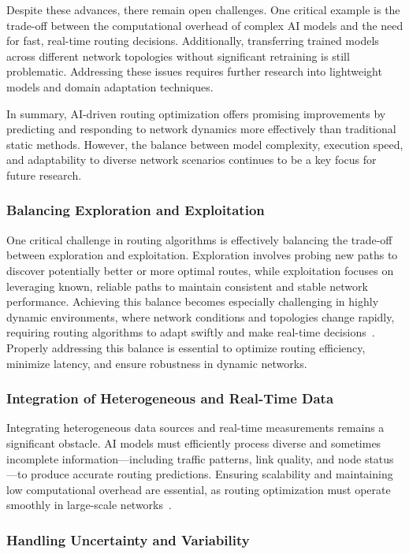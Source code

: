 \documentclass[sigconf]{acmart}
\begin{document}
Despite these advances, there remain open challenges. One critical example is the trade-off between the computational overhead of complex AI models and the need for fast, real-time routing decisions. Additionally, transferring trained models across different network topologies without significant retraining is still problematic. Addressing these issues requires further research into lightweight models and domain adaptation techniques.

In summary, AI-driven routing optimization offers promising improvements by predicting and responding to network dynamics more effectively than traditional static methods. However, the balance between model complexity, execution speed, and adaptability to diverse network scenarios continues to be a key focus for future research.

\subsubsection{Balancing Exploration and Exploitation}

One critical challenge in routing algorithms is effectively balancing the trade-off between exploration and exploitation. Exploration involves probing new paths to discover potentially better or more optimal routes, while exploitation focuses on leveraging known, reliable paths to maintain consistent and stable network performance. Achieving this balance becomes especially challenging in highly dynamic environments, where network conditions and topologies change rapidly, requiring routing algorithms to adapt swiftly and make real-time decisions~\cite{}. Properly addressing this balance is essential to optimize routing efficiency, minimize latency, and ensure robustness in dynamic networks.

\subsubsection{Integration of Heterogeneous and Real-Time Data}

Integrating heterogeneous data sources and real-time measurements remains a significant obstacle. AI models must efficiently process diverse and sometimes incomplete information—including traffic patterns, link quality, and node status—to produce accurate routing predictions. Ensuring scalability and maintaining low computational overhead are essential, as routing optimization must operate smoothly in large-scale networks~\cite{}.

\subsubsection{Handling Uncertainty and Variability}
\end{document}
